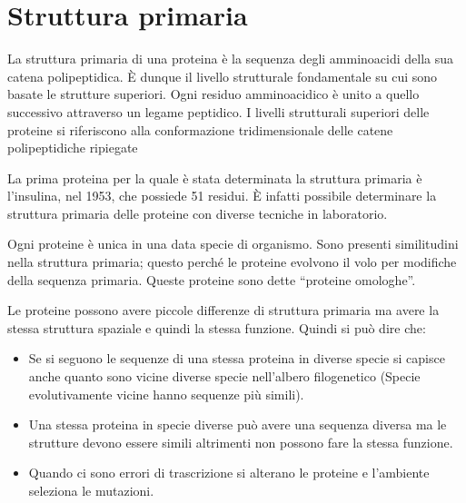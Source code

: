 
\section{Struttura primaria}

La struttura primaria di una proteina è la sequenza degli amminoacidi
della sua catena polipeptidica. È dunque il livello strutturale
fondamentale su cui sono basate le strutture superiori. Ogni residuo
amminoacidico è unito a quello successivo attraverso un legame
peptidico. I livelli strutturali superiori delle proteine si riferiscono
alla conformazione tridimensionale delle catene polipeptidiche ripiegate


La prima proteina per la quale è stata determinata la struttura primaria
è l'insulina, nel 1953, che possiede 51 residui. È infatti possibile
determinare la struttura primaria delle proteine con diverse tecniche in
laboratorio.

Ogni proteine è unica in una data specie di organismo. Sono presenti
similitudini nella struttura primaria; questo perché le proteine
evolvono il volo per modifiche della sequenza primaria. Queste proteine
sono dette ``proteine omologhe''.


Le proteine possono avere piccole
differenze di struttura primaria ma avere la stessa struttura spaziale e
quindi la stessa funzione.
Quindi si può dire che:
\begin{itemize}
\item
Se si seguono le sequenze di una stessa proteina in diverse specie si
capisce anche quanto sono vicine diverse specie nell'albero
filogenetico (Specie evolutivamente vicine hanno sequenze più simili).
\item
Una stessa proteina in specie diverse può avere una sequenza diversa
ma le strutture devono essere simili altrimenti non possono fare la
stessa funzione.
\item
Quando ci sono errori di trascrizione si alterano le proteine e
l'ambiente seleziona le mutazioni.
\end{itemize}

